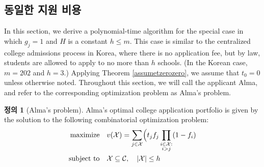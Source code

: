 \documentclass[12pt]{article} %
\newif\ifen
\theoremstyle{definition}
\newtheorem{definition}{Definition}
\theoremstyle{definition}
\newtheorem{definition}{정의}
\begin{document}
\ifen \section{Homogeneous application costs}  \else \subsection{동일한 지원 비용} \fi \label{homogappcosts}
In this section, we derive a polynomial-time algorithm for the special case in which $g_j = 1$ and $H$ is a constant $h \leq m$. This case is similar to the centralized college admissions process in Korea, where there is no application fee, but by law, students are allowed to apply to no more than $h$ schools. (In the Korean case, $m=202$ and $h=3$.) Applying Theorem \ref{assumetzerozero}, we assume that $t_0 = 0$ unless otherwise noted. Throughout this section, we will call the applicant Alma, and refer to the corresponding optimization problem as Alma's problem. 

\begin{definition}[Alma’s problem]
Alma's optimal college application portfolio is given by the solution to the following combinatorial optimization problem:
\begin{align}
\begin{split}
\text{maximize}\quad &  v(\mathcal{X}) = \sum_{j\in
\mathcal{X}} \Bigl( t_j f_j  \prod_{\substack{i \in \mathcal{X}: \\ i > j}} (1 - f_{i})\\
\text{subject to}\quad & \mathcal{X}\subseteq\mathcal{C}, \quad|\mathcal{X}| \leq h 
\end{split}
\end{align}
\end{definition}
\end{document}
